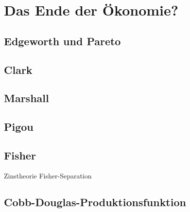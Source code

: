 %
%
%

\chapter{Das Ende der Ökonomie?}
\label{Neoklassik}

\section{Edgeworth und Pareto}

\section{Clark}

\section{Marshall}

\section{Pigou}

\section{Fisher}
Zinstheorie
Fisher-Separation

\section{Cobb-Douglas-Produktionsfunktion} \label{sec: Cobb-Douglas-Produktionsfunktion}